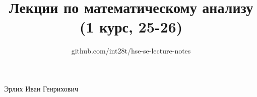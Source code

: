 \documentclass[a4paper,12pt]{article}
\title{Лекции по математическому анализу (1 курс, 25-26)}
\author{github.com/int28t/hse-se-lecture-notes}
\date{}
\begin{document}
    \pagestyle{empty}
	\maketitle
    \begin{flushright}
		Эрлих Иван Генрихович
	\end{flushright}
	\tableofcontents{}
    \newpage
    \pagestyle{plain}
    
    
    
    
    
    
    
    
    
    
    
    
    
    

    
    

    
\end{document}
